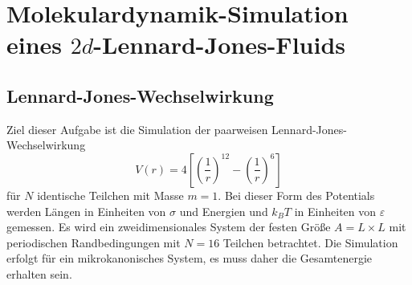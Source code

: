 



\maketitle

\section*{Molekulardynamik-Simulation eines $2d$-Lennard-Jones-Fluids}
\subsection*{Lennard-Jones-Wechselwirkung}
\label{section: Einleitung}
Ziel dieser Aufgabe ist die Simulation der paarweisen Lennard-Jones-Wechselwirkung
\begin{equation*}
    V \left(r\right) = 4 \left[\left(\frac{1}{r}\right)^{12} - \left(\frac{1}{r}\right)^{6}\right]
\end{equation*}
für $N$ identische Teilchen mit Masse $m = 1$. Bei dieser Form des Potentials werden Längen in Einheiten von $\sigma$
und Energien und $k_B T$ in Einheiten von $\varepsilon$ gemessen. 
Es wird ein zweidimensionales System der festen Größe $A = L \times L$ mit
periodischen Randbedingungen mit  $N = 16$ Teilchen betrachtet. Die Simulation erfolgt für ein mikrokanonisches System,
es muss daher die Gesamtenergie erhalten sein.

